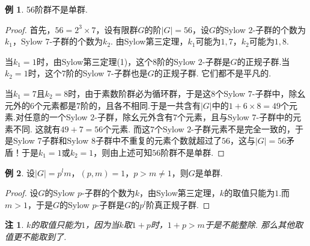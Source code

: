 \documentclass[12pt]{ctexart}
\theoremstyle{definition}
\newtheorem{example}{例}[section]
\theoremstyle{plain}
\newtheorem*{remark}{注}
\begin{document}
\begin{example}
	56阶群不是单群.
\end{example}
\begin{proof}
	首先，$56=2^3\times 7$，设有限群$G$的阶$|G|=56$，设$G$的Sylow $2$-子群的个数为$k_1$，Sylow $7$-子群的个数为$k_2$. 由Sylow第三定理，$k_1$可能为$1,7$，$k_2$可能为$1,8$.
	
	当$k_1=1$时，由Sylow第三定理(1)，这个$8$阶的Sylow $2$-子群是$G$的正规子群.当$k_2=1$时，这个$7$阶的Sylow $7$-子群也是$G$的正规子群. 它们都不是平凡的.
	
	当$k_1=7$且$k_2=8$时，由于素数阶群必为循环群，于是这$8$个Sylow $7$-子群中，除幺元外的$6$个元素都是$7$阶的，且各不相同.于是一共含有$|G|$中的$1+6\times 8=49$个元素.对任意的一个Sylow $2$-子群，除幺元外含有$7$个元素，且与Sylow $7$-子群中的元素不同. 这就有$49+7=56$个元素. 而这$7$个Sylow $2$-子群元素不是完全一致的，于是Sylow $7$子群和Sylow $8$子群中不重复的元素个数就超过了$56$，这与$|G|=56$矛盾！于是$k_1=1$或$k_2=1$，则由上述可知$56$阶群不是单群.
\end{proof}
\begin{example}
	设$|G|=p^lm$，$(p,m)=1$，$p>m\neq 1$，则$G$是单群.
\end{example}
\begin{proof}
	设$G$的Sylow $p$-子群的个数为$k$，由Sylow第三定理，$k$的取值只能为$1$.而$m>1$，于是$G$的Sylow $p$-子群是$G$的$p^l$阶真正规子群.
\end{proof}
\begin{remark}
	$k$的取值只能为$1$，因为当$k$取$1+p$时，$1+p>m$于是不能整除. 那么其他取值更不能取到了.
\end{remark}
\end{document}
